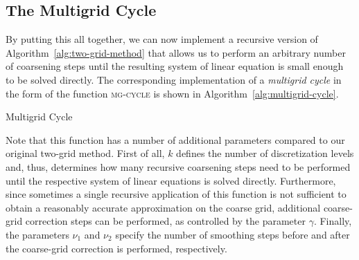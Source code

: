 \subsection{The Multigrid Cycle}\label{sec:multigrid-cycles}
By putting this all together, we can now implement a recursive version of Algorithm~\ref{alg:two-grid-method} that allows us to perform an arbitrary number of coarsening steps until the resulting system of linear equation is small enough to be solved directly.
The corresponding implementation of a \emph{multigrid cycle} in the form of the function \textsc{mg-cycle} is shown in Algorithm~\ref{alg:multigrid-cycle}.
\begin{algorithm}[h]
	\caption{Multigrid Cycle}
	\label{alg:multigrid-cycle}
	\begin{algorithmic}
		\EndFor
		\Else
		\EndFor
		\EndIf
		\EndFor
		\State {}
		\EndFunction
	\end{algorithmic}
\end{algorithm}
Note that this function has a number of additional parameters compared to our original two-grid method.
First of all, $k$ defines the number of discretization levels and, thus, determines how many recursive coarsening steps need to be performed until the respective system of linear equations is solved directly.
Furthermore, since sometimes a single recursive application of this function is not sufficient to obtain a reasonably accurate approximation on the coarse grid, additional coarse-grid correction steps can be performed, as controlled by the parameter $\gamma$.
Finally, the parameters $\nu_1$ and $\nu_2$ specify the number of smoothing steps before and after the coarse-grid correction is performed, respectively.
